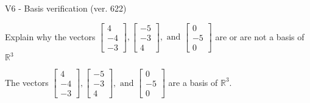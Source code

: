 \begin{exercise}
  \begin{exerciseTitle}V6 - Basis verification (ver. 622)\end{exerciseTitle}
  \begin{exerciseStatement}
    Explain why the vectors \(\left[\begin{array}{r}
4 \\
-4 \\
-3
\end{array}\right] , \left[\begin{array}{r}
-5 \\
-3 \\
4
\end{array}\right] , \text{ and } \left[\begin{array}{r}
0 \\
-5 \\
0
\end{array}\right]\) are or are not a basis of \(\mathbb{R}^3\)	


  \end{exerciseStatement}
  \begin{exerciseAnswer}
   The vectors \(\left[\begin{array}{r}
4 \\
-4 \\
-3
\end{array}\right] , \left[\begin{array}{r}
-5 \\
-3 \\
4
\end{array}\right] , \text{ and } \left[\begin{array}{r}
0 \\
-5 \\
0
\end{array}\right]\) 
  	 are  a basis of \(\mathbb{R}^3\).
  


  \end{exerciseAnswer}
\end{exercise}